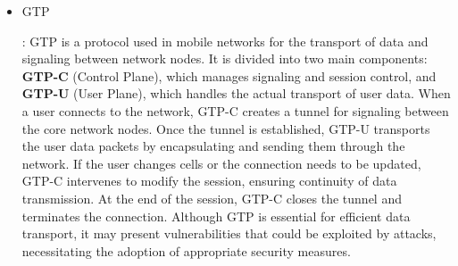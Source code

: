 \documentclass[english]{article}
\begin{document}
\begin{itemize}
	\item \hypertarget{GTP}{GTP}:
	      GTP is a protocol used in mobile networks for the transport of data and signaling
	      between network nodes. It is divided into two main components:
	      \textbf{GTP-C} (Control Plane), which manages signaling and session control,
	      and \textbf{GTP-U} (User Plane), which handles the actual transport of user data.
	      When a user connects to the network, GTP-C creates a tunnel for signaling between
	      the core network nodes. Once the tunnel is established, GTP-U transports the user
	      data packets by encapsulating and sending them through the network. If the user
	      changes cells or the connection needs to be updated, GTP-C intervenes to modify
	      the session, ensuring continuity of data transmission. At the end of the session,
	      GTP-C closes the tunnel and terminates the connection. Although GTP is essential
	      for efficient data transport, it may present vulnerabilities that could be exploited
	      by attacks, necessitating the adoption of appropriate security measures.


\end{itemize}
\end{document}
